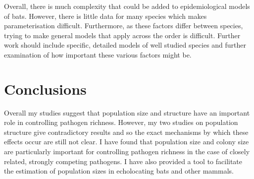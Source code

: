 Overall, there is much complexity that could be added to epidemiological models of bats.
However, there is little data for many species which makes parameterisation difficult.
Furthermore, as these factors differ between species, trying to make general models that apply across the order is difficult.
Further work should include specific, detailed models of well studied species and further examination of how important these various factors might be.




\section{Conclusions}


Overall my studies suggest that population size and structure have an important role in controlling pathogen richness. 
However, my two studies on population structure give contradictory results and so the exact mechanisms by which these effects occur are still not clear.
I have found that population size and colony size are particularly important for controlling pathogen richness in the case of closely related, strongly competing pathogens.
I have also provided a tool to facilitate the estimation of population sizes in echolocating bats and other mammals.



